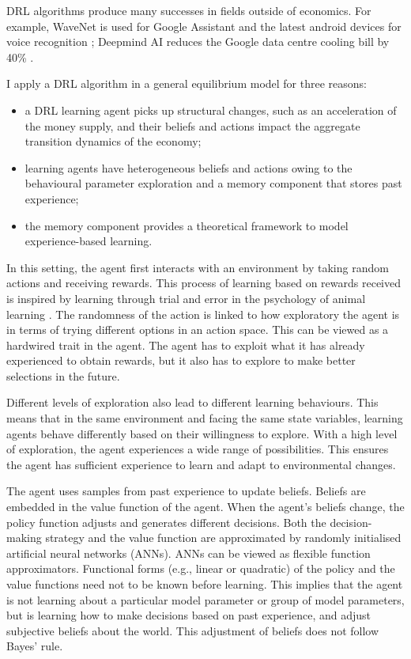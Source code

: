 \documentclass[hidelinks]{article}
\begin{document}
DRL algorithms produce many successes in fields outside of economics. For example, WaveNet is used for Google Assistant and the latest android devices for voice recognition \citep{Wavenet}; Deepmind AI reduces the Google data centre cooling bill by 40\% \citep{Googlecooling}.  

I apply a DRL algorithm in a general equilibrium model for three reasons: 
\begin{itemize}
    \item a DRL learning agent picks up structural changes, such as an acceleration of the money supply, and their beliefs and actions impact the aggregate transition dynamics of the economy;
    \item learning agents have heterogeneous beliefs and actions owing to the behavioural parameter exploration and a memory component that stores past experience;
    \item the memory component provides a theoretical framework to model experience-based learning.
\end{itemize} 

In this setting, the agent first interacts with an environment by taking random actions and receiving rewards. This process of learning based on rewards received is inspired by learning through trial and error in the psychology of animal learning \citep{SB2018}. The randomness of the action is linked to how exploratory the agent is in terms of trying different options in an action space. This can be viewed as a hardwired trait in the agent. The agent has to exploit what it has already experienced to obtain rewards, but it also has to explore to make better selections in the future. 

Different levels of exploration also lead to different learning behaviours. This means that in the same environment and facing the same state variables, learning agents behave differently based on their willingness to explore. With a high level of exploration, the agent experiences a wide range of possibilities. This ensures the agent has sufficient experience to learn and adapt to environmental changes. 

The agent uses samples from past experience to update beliefs. Beliefs are embedded in the value function of the agent. When the agent's beliefs change, the policy function adjusts and generates different decisions. Both the decision-making strategy and the value function are approximated by randomly initialised artificial neural networks (ANNs). ANNs can be viewed as flexible function approximators. Functional forms (e.g., linear or quadratic) of the policy and the value functions need not to be known before learning. This implies that the agent is not learning about a particular model parameter or group of model parameters, but is learning how to make decisions based on past experience, and adjust subjective beliefs about the world. This adjustment of beliefs does not follow Bayes' rule.  
\end{document}
